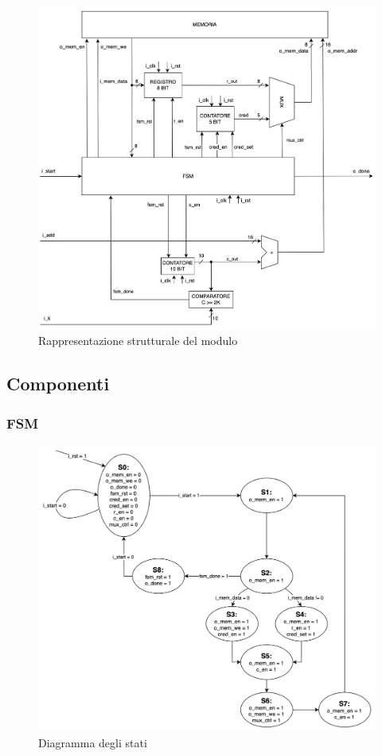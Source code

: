 \begin{figure}[H]
    \centering
    \includegraphics[width=1\textwidth]{figures/project.png}
    \caption{Rappresentazione strutturale del modulo}
    \label{fig:project}
\end{figure}

\subsection{Componenti}

\subsubsection{FSM}
\begin{figure}[H]
    \centering
    \includegraphics[width=1\textwidth]{figures/fsm.png}
    \caption{Diagramma degli stati}
    \label{fig:fsm}
\end{figure}

